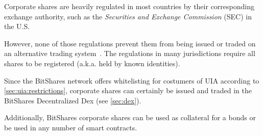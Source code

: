 Corporate shares are heavily regulated in most countries by their corresponding
exchange authority, such as the \emph{Securities and Exchange Commission} (SEC)
in the U.S.

However, none of those regulations prevent them from being issued or traded on
an alternative trading system~\cite{altTrade}. The regulations in many
jurisdictions require all shares to be registered (a.k.a. held by known
identities). 

Since the BitShares network offers whitelisting for costumers of UIA according
to \cref{sec:uia:restrictions}, corporate shares can certainly be issued and
traded in the BitShares Decentralized Dex (see \cref{sec:dex}).

Additionally, BitShares corporate shares can be used as collateral for a bonds
or be used in any number of smart contracts.
